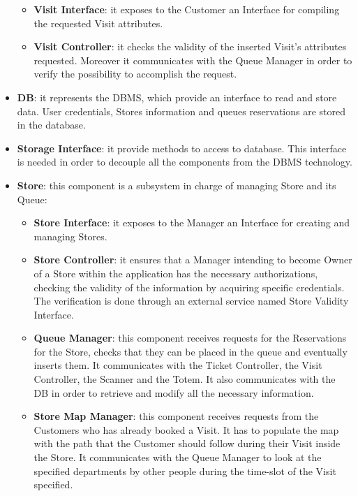 \documentclass[a4paper, 12pt, oneside, table]{article}
\begin{document}
\begin{itemize}
    \begin{itemize}
        \item \textbf{Visit Interface}: it exposes to the Customer an Interface for compiling the requested Visit attributes.
        \item \textbf{Visit Controller}: it checks the validity of the inserted Visit's attributes requested. Moreover it communicates with the Queue Manager in order to verify the possibility to accomplish the request.
    \end{itemize}
    \item \textbf{DB}: it represents the DBMS, which provide an interface to read and store data. User credentials, Stores information and queues reservations are stored in the database.
    \item \textbf{Storage Interface}: it provide methods to access to database. This interface is needed in order to decouple all the components from the DBMS technology.
    \item \textbf{Store}: this component is a subsystem in charge of managing Store and its Queue:
    \begin{itemize}
        \item \textbf{Store Interface}: it exposes to the Manager an Interface for creating and managing Stores.
        \item \textbf{Store Controller}: it ensures that a Manager intending to become Owner of a Store within the application has the necessary authorizations, checking the validity of the information by acquiring specific credentials. The verification is done through an external service named Store Validity Interface.
        \item \textbf{Queue Manager}: this component receives requests for the Reservations for the Store, checks that they can be placed in the queue and eventually inserts them. It communicates with the Ticket Controller, the Visit Controller, the Scanner and the Totem. It also communicates with the DB in order to retrieve and modify all the necessary information.
        \item \label{comp:storeMapMan} \textbf{Store Map Manager}: this component receives requests from the Customers who has already booked a Visit. It has to populate the map with the path that the Customer should follow during their Visit inside the Store. It communicates with the Queue Manager to look at the specified departments by other people during the time-slot of the Visit specified.
    \end{itemize}

\end{itemize}
\end{document}
